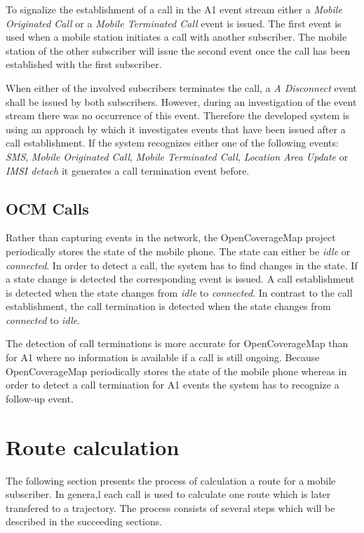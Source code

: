 \documentclass[master,english]{hgbthesis}
\begin{document}
To signalize the establishment of a call in the A1 event stream either a \emph{Mobile Originated Call} or a \emph{Mobile Terminated Call} event is issued. The first event is used when a mobile station initiates a call with another subscriber. The mobile station of the other subscriber will issue the second event once the call has been established with the first subscriber.

When either of the involved subscribers terminates the call, a \emph{A Disconnect} event shall be issued by both subscribers. However, during an investigation of the event stream there was no occurrence of this event. Therefore the developed system is using an approach by which it investigates events that have been issued after a call establishment. If the system recognizes either one of the following events: \emph{SMS}, \emph{Mobile Originated Call}, \emph{Mobile Terminated Call}, \emph{Location Area Update} or \emph{IMSI detach} it generates a call termination event before. 

\subsection{OCM Calls}

Rather than capturing events in the network, the OpenCoverageMap project periodically stores the state of the mobile phone. The state can either be \emph{idle} or \emph{connected}. In order to detect a call, the system has to find changes in the state. If a state change is detected the corresponding event is issued. A call establishment is detected when the state changes from \emph{idle} to \emph{connected}. In contrast to the call establishment, the call termination is detected when the state changes from \emph{connected} to \emph{idle}. 

The detection of call terminations is more accurate for OpenCoverageMap than for A1 where no information is available if a call is still ongoing. Because OpenCoverageMap periodically stores the state of the mobile phone whereas in order to detect a call termination for A1 events the system has to recognize a follow-up event.

\section{Route calculation}

The following section presents the process of calculation a route for a mobile subscriber. In genera,l each call is used to calculate one route which is later transfered to a trajectory. The process consists of several steps which will be described in the succeeding sections.  
\end{document}
